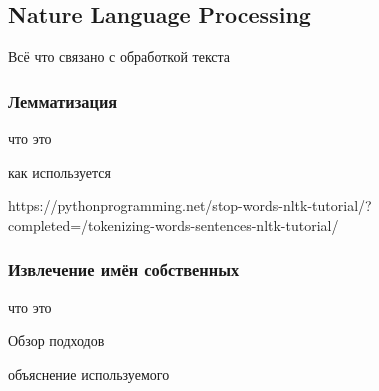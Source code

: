 \subsection{Nature Language Processing}
    Всё что связано с обработкой текста

    \subsubsection{Лемматизация}
    \label{subsubsec:lemma}
        что это

        как используется

        https://pythonprogramming.net/stop-words-nltk-tutorial/?completed=/tokenizing-words-sentences-nltk-tutorial/
    \subsubsection{Извлечение имён собственных}
        что это

        Обзор подходов

        объяснение используемого
